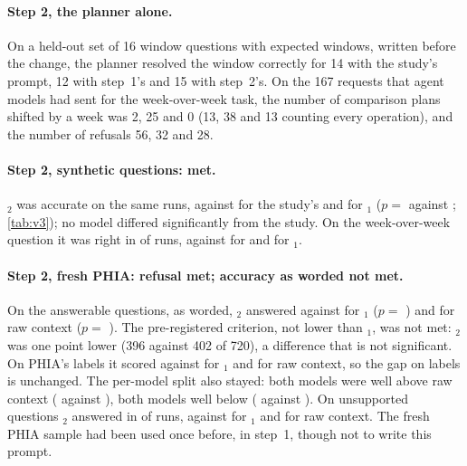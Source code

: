 \paragraph{Step 2, the planner alone.} On a held-out set of 16 window questions with expected windows, written before
the change, the planner resolved the window correctly for 14 with the study's prompt, 12 with step~1's and 15 with
step~2's. On the 167 requests that agent models had sent for the week-over-week task, the number of comparison
plans shifted by a week was 2, 25 and 0 (13, 38 and 13 counting every operation), and the number of refusals 56, 32
and 28.

\paragraph{Step 2, synthetic questions: met.} \CC{}$_2$ was \vthreeAccThree{} accurate on the same \vthreeAccN{} runs,
against \vthreeAccOne{} for the study's \CC{} and \vthreeAccTwo{} for \CC{}$_1$ ($p=$ \vthreeAccP{} against \CC{};
\cref{tab:v3}); no model differed significantly from the study. On the week-over-week question it was right in
\vthreeWeekThree{} of \vthreeWeekN{} runs, against \vthreeWeekOne{} for \CC{} and \vthreeWeekTwo{} for \CC{}$_1$.

\paragraph{Step 2, fresh PHIA: refusal met; accuracy as worded not met.} On the answerable questions, as worded,
\CC{}$_2$ answered \vthreePhiaWordedThree{} against \vthreePhiaWordedTwo{} for \CC{}$_1$ ($p=$ \vthreePhiaWordedPvsTwo{})
and \vthreePhiaWordedA{} for raw context ($p=$ \vthreePhiaWordedP{}). The
pre-registered criterion, not lower than \CC{}$_1$, was not met: \CC{}$_2$ was one point lower (396 against 402 of 720),
a difference that is not significant. On PHIA's labels it scored \vthreePhiaLabelThree{} against
\vthreePhiaLabelTwo{} for \CC{}$_1$ and \vthreePhiaLabelA{} for raw context, so the gap on labels is unchanged. The
per-model split also stayed: both  models were well above raw context (
\vthreePhiaWordedLlamaThree{} against \vthreePhiaWordedLlamaThreeA{}), both  models well below
( \vthreePhiaWordedOssLarge{} against \vthreePhiaWordedOssLargeA{}). On unsupported questions
\CC{}$_2$ answered  in \vthreePhiaUnsupThree{} of runs, against \vthreePhiaUnsupTwo{} for \CC{}$_1$ and
\vthreePhiaUnsupA{} for raw context. The fresh PHIA sample had been used once before, in step~1, though not to write
this prompt.

